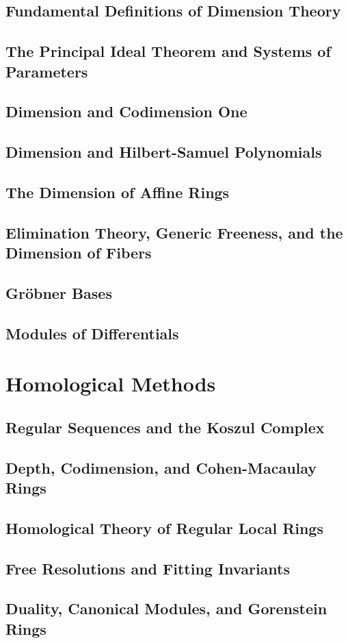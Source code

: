 \documentclass[oneside]{amsbook}
\begin{document}
\chapter{Fundamental Definitions of Dimension Theory}


\chapter{The Principal Ideal Theorem and Systems of Parameters}


\chapter{Dimension and Codimension One}


\chapter{Dimension and Hilbert-Samuel Polynomials}


\chapter{The Dimension of Affine Rings}


\chapter{Elimination Theory, Generic Freeness, and the Dimension of Fibers}


\chapter{Gröbner Bases}


\chapter{Modules of Differentials}


\part{Homological Methods}
\chapter{Regular Sequences and the Koszul Complex}


\chapter{Depth, Codimension, and Cohen-Macaulay Rings}


\chapter{Homological Theory of Regular Local Rings}


\chapter{Free Resolutions and Fitting Invariants}


\chapter{Duality, Canonical Modules, and Gorenstein Rings}

\end{document}
